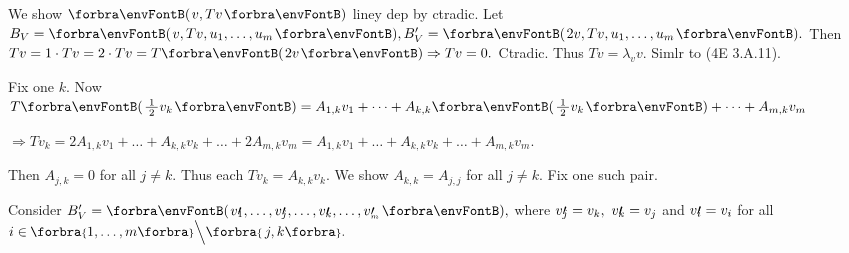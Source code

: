 We show $\Par{v,Tv}$ liney dep by ctradic. Let $B_V=\Par{v,Tv,u_1,\dots,u_m},B_V'=\Par{2v,Tv,u_1,\dots,u_m}.$\parSol{}
Then $Tv=1\cdot Tv=2\cdot Tv=T\Par{2v}\Rightarrow Tv=0.$ Ctradic. Thus $Tv=\lambda_v v.$ \;Simlr to (4E 3.A.11).\PfEnd\vspace{2pt}\quad
{}\par\quad
{\FontSmall Fix one $k.$ Now \,$T\Par{\frac{\;1\;}{2}v_k}=A_{1,k}v_1+\dots+A_{k,k}\Par{\frac{\;1\;}{2}v_k}+\dots+A_{m,k}v_m$}\par\quad
{\FontSmall$\Rightarrow Tv_k=2A_{1,k}v_1+\dots+A_{k,k}v_k+\dots+2A_{m,k}v_m=A_{1,k}v_1+\dots+A_{k,k}v_k+\dots+A_{m,k}v_m.$}\par\quad
{\FontSmall Then $A_{j,k}=0$ for all $j\neq k.$ Thus each $Tv_k=A_{k,k}v_k.$} \;We show $A_{k,k}=A_{j,j}$ for all $j\neq k.$ Fix one such pair.\vspace{1pt}\par\quad
Consider $B_V'=\Par{v\apostrophe{\hspace{-3pt}_1},\dots,v\apostrophe{\hspace{-3pt}_j},\dots,v\apostrophe{\hspace{-3pt}_k},\dots,v\apostrophe_{\hspace{-3pt}_m}},$ where $v\prime{\hspace{-3pt}_j}=v_k,\,\,v\prime{\hspace{-3pt}_k}=v_j$ and $v\prime{\hspace{-3pt}_i}=v_i$ for all $i\in\;\!\!\Bra{1,\dots,m}\Backslash[\Big]\Bra{\,j,k}.$\vspace{1pt}\par\quad
